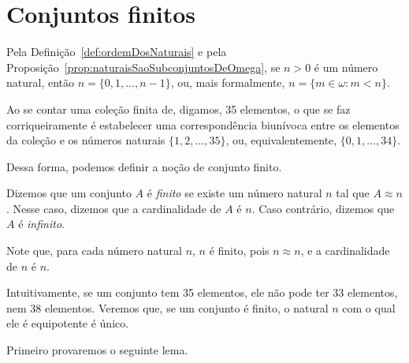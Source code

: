 \section{Conjuntos finitos}\label{sec:conjuntosFinitos}

Pela Definição~\ref{def:ordemDosNaturais} e pela Proposição~\ref{prop:naturaisSaoSubconjuntosDeOmega}, se $n>0$ é um número natural, então $n=\{0,1,\ldots,n-1\}$, ou, mais formalmente, $n=\{m\in\omega : m<n\}$.

Ao se contar uma coleção finita de, digamos, 35 elementos, o que se faz corriqueiramente é estabelecer uma correspondência biunívoca entre os elementos da coleção e os números naturais $\{1, 2, \ldots, 35\}$, ou, equivalentemente, $\{0, 1, \ldots, 34\}$.

Dessa forma, podemos definir a noção de conjunto finito.

\begin{definition}[$Z^--P$]\label{def:conjuntoFinito}
    Dizemos que um conjunto $A$ é \emph{finito} se existe um número natural $n$ tal que $A\approx n$.
    Nesse caso, dizemos que a cardinalidade de $A$ é $n$.
    Caso contrário, dizemos que $A$ é \emph{infinito}.
\end{definition}

Note que, para cada número natural $n$, $n$ é finito, pois $n\approx n$, e a cardinalidade de $n$ é $n$.

Intuitivamente, se um conjunto tem 35 elementos, ele não pode ter 33 elementos, nem 38 elementos.
Veremos que, se um conjunto é finito, o natural $n$ com o qual ele é equipotente é único.

Primeiro provaremos o seguinte lema.

